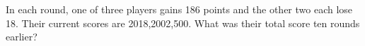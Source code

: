 In each round, one of three players gains 186 points and the other two each lose 18. Their current scores are 2018,2002,500. What was their total score ten rounds earlier?
